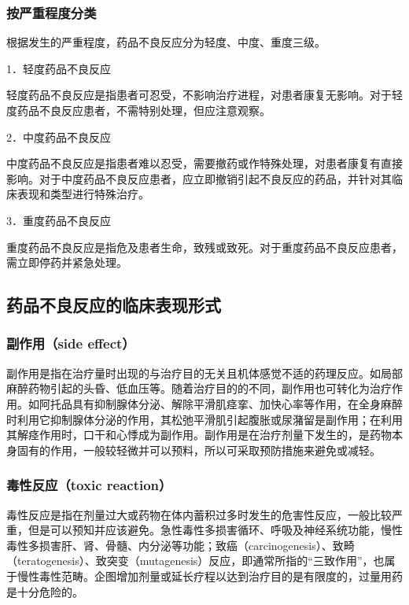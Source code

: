 \subsubsection{按严重程度分类}

根据发生的严重程度，药品不良反应分为轻度、中度、重度三级。

1．轻度药品不良反应

轻度药品不良反应是指患者可忍受，不影响治疗进程，对患者康复无影响。对于轻度药品不良反应患者，不需特别处理，但应注意观察。

2．中度药品不良反应

中度药品不良反应是指患者难以忍受，需要撤药或作特殊处理，对患者康复有直接影响。对于中度药品不良反应患者，应立即撤销引起不良反应的药品，并针对其临床表现和类型进行特殊治疗。

3．重度药品不良反应

重度药品不良反应是指危及患者生命，致残或致死。对于重度药品不良反应患者，需立即停药并紧急处理。

\subsection{药品不良反应的临床表现形式}

\subsubsection{副作用（side effect）}

副作用是指在治疗量时出现的与治疗目的无关且机体感觉不适的药理反应。如局部麻醉药物引起的头昏、低血压等。随着治疗目的的不同，副作用也可转化为治疗作用。如阿托品具有抑制腺体分泌、解除平滑肌痉挛、加快心率等作用，在全身麻醉时利用它抑制腺体分泌的作用，其松弛平滑肌引起腹胀或尿潴留是副作用；在利用其解痉作用时，口干和心悸成为副作用。副作用是在治疗剂量下发生的，是药物本身固有的作用，一般较轻微并可以预料，所以可采取预防措施来避免或减轻。

\subsubsection{毒性反应（toxic reaction）}

毒性反应是指在剂量过大或药物在体内蓄积过多时发生的危害性反应，一般比较严重，但是可以预知并应该避免。急性毒性多损害循环、呼吸及神经系统功能，慢性毒性多损害肝、肾、骨髓、内分泌等功能；致癌（carcinogenesis）、致畸（teratogenesis）、致突变（mutagenesis）反应，即通常所指的“三致作用”，也属于慢性毒性范畴。企图增加剂量或延长疗程以达到治疗目的是有限度的，过量用药是十分危险的。


